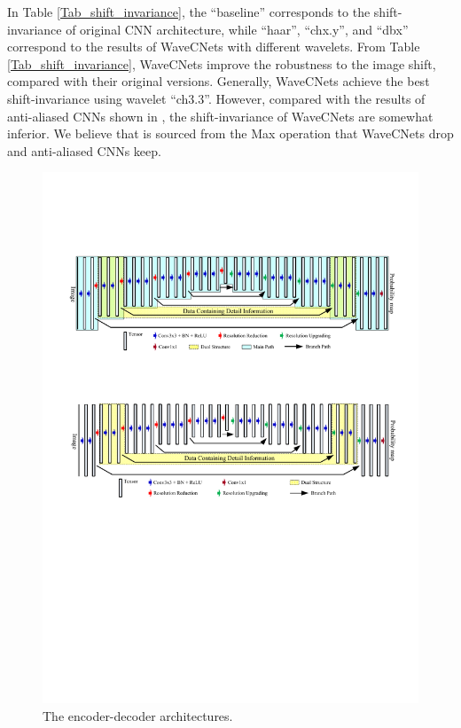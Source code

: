 In Table \ref{Tab_shift_invariance}, the ``baseline'' corresponds to the shift-invariance of original CNN architecture,
while ``haar'', ``chx.y'', and ``dbx'' correspond to the results of WaveCNets with different wavelets.
From Table \ref{Tab_shift_invariance}, WaveCNets improve the robustness to the image shift, compared with their original versions.
Generally, WaveCNets achieve the best shift-invariance using wavelet ``ch3.3''.
However, compared with the results of anti-aliased CNNs shown in \cite{zhang2019making},
the shift-invariance of WaveCNets are somewhat inferior.
We believe that is sourced from the Max operation that WaveCNets drop and anti-aliased CNNs keep.

\begin{figure}[t]
	\centering
	\includegraphics*[scale=0.8, viewport=43 558 558 710]{figures/comparison_encoder_decoders.pdf}
	\caption{The encoder-decoder architectures.}\label{fig_encoder_decoder}
\end{figure}
